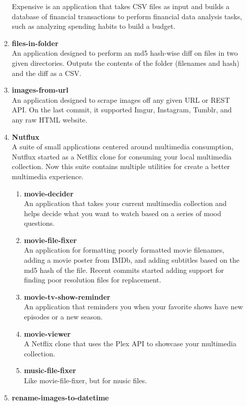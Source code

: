 \documentclass[oneside]{article}%
\begin{document}
\begin{enumerate}[]
\begin{enumerate}[]
				Expensive\textsuperscript{\textcopyright} is an application that takes CSV files as input and builds a database of financial transactions to perform financial data analysis tasks, such as analyzing spending habits to build a budget.
			\item \textbf{files-in-folder}\\
				An application designed to perform an md5 hash-wise diff on files in two given directories. Outputs the contents of the folder (filenames and hash) and the diff as a CSV.
			\item \textbf{images-from-url}\\
				An application designed to scrape images off any given URL or REST API. On the last commit, it supported Imgur, Instagram, Tumblr, and any raw HTML website.
			\item \textbf{Nutflux}\\
				A suite of small applications centered around multimedia consumption, Nutflux\textsuperscript{\textcopyright} started as a Netflix clone for consuming your local multimedia collection. Now this suite contains multiple utilities for create a better multimedia experience.
				\begin{enumerate}[]
					\item \textbf{movie-decider}\\
						An application that takes your current multimedia collection and helps decide what you want to watch based on a series of mood questions.
					\item \textbf{movie-file-fixer}\\
						An application for formatting poorly formatted movie filenames, adding a movie poster from IMDb, and adding subtitles based on the md5 hash of the file. Recent commits started adding support for finding poor resolution files for replacement.
					\item \textbf{movie-tv-show-reminder}\\
						An application that reminders you when your favorite shows have new episodes or a new season.
					\item \textbf{movie-viewer}\\
						A Netflix clone that uses the Plex API to showcase your multimedia collection.
					\item \textbf{music-file-fixer}\\
						Like movie-file-fixer, but for music files.
				\end{enumerate}
			\item \textbf{rename-images-to-datetime}\\

\end{enumerate}
\end{enumerate}
\end{document}
